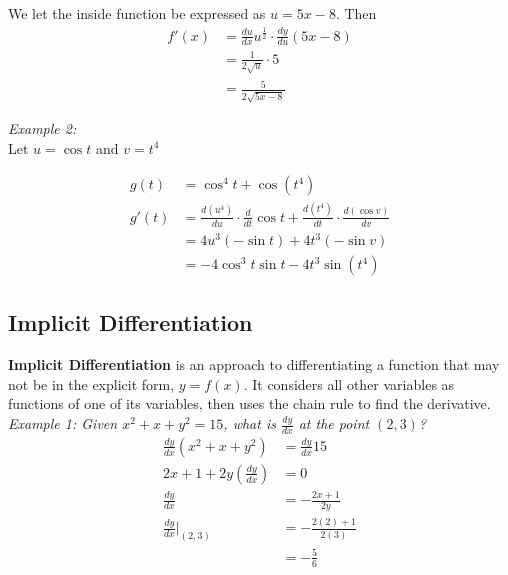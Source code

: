         \noindent We let the inside function be expressed as $u=5x-8$. Then \\

        \begin{align*}
            f'(x) &= \frac{du}{dx}u^{\frac{1}{2}}\cdot\frac{dy}{du}(5x-8) \\
            &= \frac{1}{2\sqrt{u}}\cdot 5 \\
            &= \frac{5}{2\sqrt{5x-8}}
        \end{align*}

        \noindent \color{blue} \textit{Example 2:} \color{black} \\
        \noindent Let $u=\cos{t}$ and $v=t^4$

        \begin{align*}
            g(t) &= \cos^4{t} + \cos{(t^4)} \\
            g'(t) &= \frac{d(u^4)}{du} \cdot \frac{d}{dt}\cos{t}
            +
            \frac{d(t^4)}{dt} \cdot \frac{d(\cos{v})}{dv} \\
            &= 4u^3(-\sin{t}) + 4t^3(-\sin{v}) \\
            &= -4\cos^3{t}\sin{t} - 4t^3\sin{(t^4)}
        \end{align*}

    \subsection{Implicit Differentiation}
        \color{purple} \textbf{Implicit Differentiation} \color{black} is an approach to
        differentiating a function that may not be in the explicit form, $y=f(x)$. It
        considers all other variables as functions of one of its variables, then uses the
        chain rule to find the derivative. \\

        \noindent \color{blue} \textit{Example 1: Given $x^2+x+y^2=15$, what is $\frac{dy}{dx}$
        at the point $(2,3)$?} \color{black} \\

        \begin{align*}
            \frac{dy}{dx}(x^2+x+y^2) &= \frac{dy}{dx}15 \\
            2x + 1 + 2y\left(\frac{dy}{dx}\right) &= 0 \\
            \frac{dy}{dx} &= -\frac{2x+1}{2y} \\
            \frac{dy}{dx}\Bigr|_{(2,3)} &= -\frac{2(2)+1}{2(3)} \\
            &= -\frac{5}{6}
        \end{align*}

